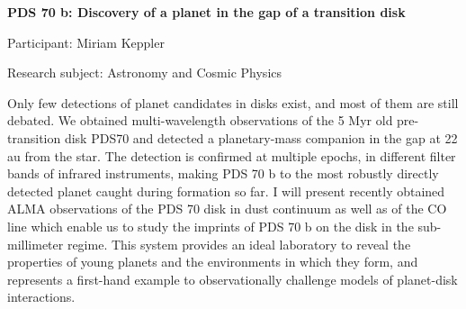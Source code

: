 \begin{minipage}[t]{1.0\textwidth}

\begin{center}

{{\large\bfseries PDS 70 b: Discovery of a planet in the gap of a transition disk}\par}

\end{center}

{\noindent Participant: Miriam Keppler\par} 

{\noindent Research subject: Astronomy and Cosmic Physics\par}\medskip

\noindent Only few detections of planet candidates in disks exist, and most of
them are still debated. We obtained multi-wavelength observations of
the 5 Myr old pre-transition disk PDS70 and detected a planetary-mass companion in the gap at 22 au from the star. The detection is confirmed
at multiple epochs, in different filter bands of infrared instruments, making PDS 70 b to the most robustly directly detected planet caught during formation so far. I will present recently obtained ALMA observations of the PDS 70 disk in dust continuum as well as of the CO line which enable us to study the imprints of PDS 70 b on the disk in the sub-millimeter regime. 
This system provides an ideal laboratory to reveal the properties of young planets and the environments in which they form, and represents  a first-hand example to observationally challenge models of planet-disk interactions. \par\end{minipage}

\hfill 

